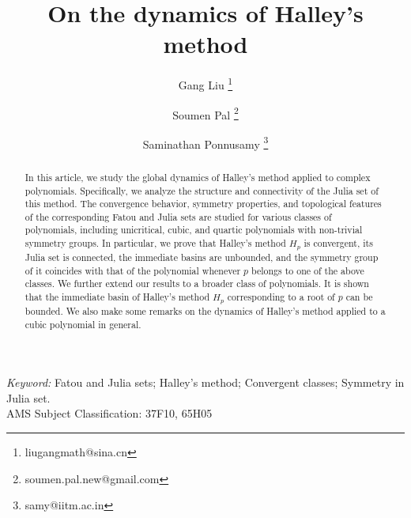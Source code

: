 \documentclass[12pt]{article}
\date{}
\begin{document}
	\title{On the dynamics of Halley's method}
	
	\author[1]{Gang Liu \footnote{liugangmath@sina.cn}}
	\author[2]{Soumen Pal \footnote{soumen.pal.new@gmail.com}}
	\author[2]{Saminathan Ponnusamy  \footnote{samy@iitm.ac.in}}
	\date{}
	\maketitle
\begin{abstract}
In this article, we study the global dynamics of Halley's method applied to complex polynomials. Specifically, we analyze the structure and connectivity of the Julia set of this method. The convergence behavior, symmetry properties, and topological features of the corresponding Fatou and Julia sets are studied for various classes of polynomials, including unicritical, cubic, and quartic polynomials with non-trivial symmetry groups. In particular, we prove that Halley's method $H_p$ is convergent, its Julia set is connected, the immediate basins are unbounded, and the symmetry group of it coincides with that of the polynomial whenever $p$ belongs to one of the above classes. We further extend our results to a broader class of polynomials. It is shown that the immediate basin of Halley's method $H_p$ corresponding to a root of $p$ can be bounded. We also make some remarks on the dynamics of Halley's method applied to a cubic polynomial in general.		
\end{abstract}
	\textit{Keyword:} Fatou and Julia sets; Halley's method; Convergent classes; Symmetry in Julia set.\\
	AMS Subject Classification: 37F10, 65H05
\end{document}
